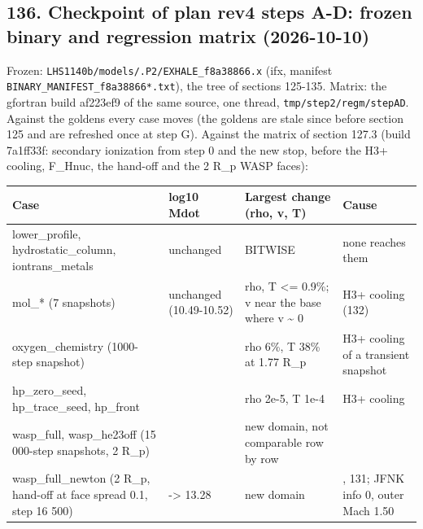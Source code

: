 \documentclass[english,a4paper]{my_memo}
\begin{document}
\subsection{136. Checkpoint of plan rev4 steps A-D: frozen binary and regression matrix (2026-10-10)}\label{136-checkpoint-of-plan-rev4-steps-a-d-frozen-binary-and-regression-matrix-2026-10-10}

Frozen: \texttt{LHS1140b/models/.P2/EXHALE\_f8a38866.x} (ifx, manifest
\texttt{BINARY\_MANIFEST\_f8a38866*.txt}), the tree of sections 125-135. Matrix: the
gfortran build af223ef9 of the same source, one thread, \texttt{tmp/step2/regm/stepAD}.
Against the goldens every case moves (the goldens are stale since before
section 125 and are refreshed once at step G). Against the matrix of section
127.3 (build 7a1ff33f: secondary ionization from step 0 and the new stop,
before the H3+ cooling, F\_Hnuc, the hand-off and the 2 R\_p WASP faces):

{\def\LTcaptype{none} %
{\small
\begin{longtable}[]{@{}>{\raggedright\arraybackslash}p{\dimexpr(\linewidth-8\tabcolsep)/4\relax}>{\raggedright\arraybackslash}p{\dimexpr(\linewidth-8\tabcolsep)/4\relax}>{\raggedright\arraybackslash}p{\dimexpr(\linewidth-8\tabcolsep)/4\relax}>{\raggedright\arraybackslash}p{\dimexpr(\linewidth-8\tabcolsep)/4\relax}@{}}
\toprule\noalign{}
Case & log10 Mdot & Largest change (rho, v, T) & Cause \\
\midrule\noalign{}
\endhead
\bottomrule\noalign{}
\endlastfoot
lower\_profile, hydrostatic\_column, iontrans\_metals & unchanged & BITWISE & none reaches them \\
mol\_* (7 snapshots) & unchanged (10.49-10.52) & rho, T \textless= 0.9\%; v near the base where v \textasciitilde{} 0 & H3+ cooling (132) \\
oxygen\_chemistry (1000-step snapshot) & 9.40 & rho 6\%, T 38\% at 1.77 R\_p & H3+ cooling of a transient snapshot \\
hp\_zero\_seed, hp\_trace\_seed, hp\_front & 10.56 & rho 2e-5, T 1e-4 & H3+ cooling \\
wasp\_full, wasp\_he23off (15 000-step snapshots, 2 R\_p) & 13.24 & new domain, not comparable row by row & 127.6 \\
wasp\_full\_newton (2 R\_p, hand-off at face spread 0.1, step 16 500) & 13.29 -\textgreater{} 13.28 & new domain & 127.6, 131; JFNK info 0, outer Mach 1.50 \\
\end{longtable}
}
}
\end{document}
